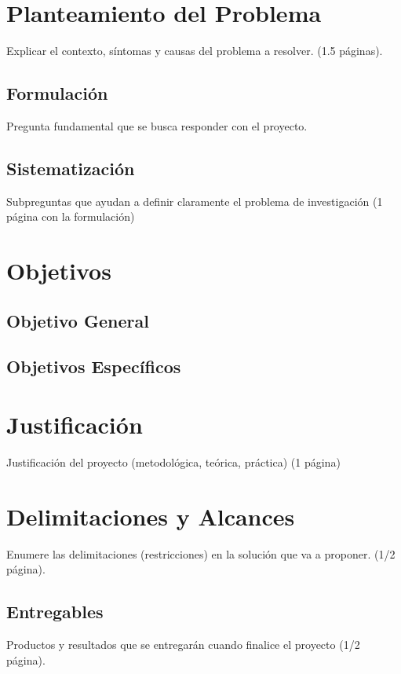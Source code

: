
\section{Planteamiento del Problema}
Explicar el contexto, s\'intomas y causas del problema a resolver. (1.5 p\'aginas). 

\subsection{Formulaci\'on}
Pregunta fundamental que se busca responder con el proyecto. 
\subsection{Sistematizaci\'on}
Subpreguntas que ayudan a definir claramente el problema de investigaci\'on (1 p\'agina con la formulaci\'on)

\section{Objetivos}
\subsection{Objetivo General}
\subsection{Objetivos Espec\'ificos}

\section{Justificaci\'on}
Justificaci\'on del proyecto (metodol\'ogica, te\'orica, pr\'actica) (1 p\'agina)


\section{Delimitaciones y Alcances}
Enumere las delimitaciones (restricciones) en la soluci\'on que va a proponer.  (1/2 p\'agina). 
\subsection{Entregables}
Productos y resultados que se entregar\'an cuando finalice el proyecto (1/2 p\'agina). 


